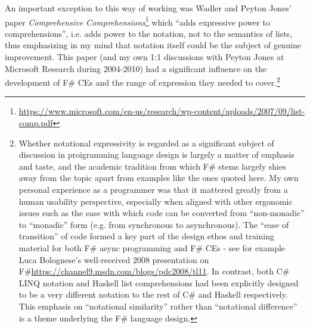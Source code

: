 \documentclass[acmsmall]{acmart}\settopmatter{}
\begin{document}
An important exception to this way of working was Wadler and Peyton Jones' paper
\textit{Comprehensive Comprehensions}\footnote{\url{https://www.microsoft.com/en-us/research/wp-content/uploads/2007/09/list-comp.pdf}} which
``adds expressive power to comprehensions'', i.e. adds power to the notation, not to the semantics of lists, thus emphasizing in my mind that
notation itself could be the subject of genuine improvement.
This paper (and my own 1:1 discussions with Peyton Jones at Microsoft Research during 2004-2010) had a significant influence on the
development of F\# CEs and the range of expression they needed to cover.\footnote{Whether notational expressivity is regarded as
a significant subject of discussion in proigramming language design is largely a matter of emphasis and taste, and the academic
tradition from which F\# stems largely shies away from the topic apart from examples like the ones quoted here.
My own personal experience as a programmer was that it mattered greatly from a human usability perspective, especially
when aligned with other ergonomic issues such as the ease with which code can be converted from ``non-monadic'' to ``monadic''
form (e.g. from synchronous to asynchronous). The ``ease of transition'' of code formed a key part
of the design ethos and training material for both F\# async programming and F\#  CEs - see for example Luca Bolognese's
well-received 2008 presentation on F\#\url{https://channel9.msdn.com/blogs/pdc2008/tl11}.  In contrast, both C\# LINQ notation
and Haskell list comprehensions had been explicitly designed to be a very different notation to the rest of C\# and Haskell respectively.
This emphasis on ``notational similarity'' rather than ``notational difference'' is a theme underlying the F\# language design.}
\end{document}
